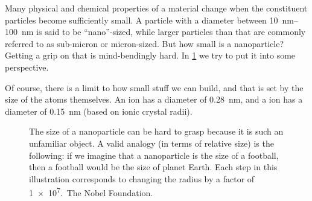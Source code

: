 \documentclass[draft,webedition,openright,titles,swedish,english]{LuaUUThesis}\usepackage[]{graphicx}\usepackage[]{xcolor}
\begin{document}
Many physical and chemical properties of a material change when
the constituent particles become sufficiently small.
A particle with a diameter between \qtyrange{10}{100}{\nm} is said to be
\enquote{nano}-sized, while larger particles than that are commonly referred
to as sub-micron or micron-sized.
But how small is a nanoparticle?
Getting a grip on that is mind-bendingly hard.
In \cref{fig:0100-nanoparticles-are-small} we try to put it into some perspective.

Of course, there is a limit to how small stuff we can build, and that is set by the size
of the atoms themselves. An \oxide{} ion has a diameter of \qty{0.28}{\nm},
and a  ion has a diameter of \qty{0.15}{\nm} (based on ionic crystal radii).

%

\begin{figure}[tbp]
\centering
\caption[A nanoparticle is very small]{%
   The size of a nanoparticle can be hard to grasp because it is such an unfamiliar
   object. A valid analogy (in terms of relative size) is the following:
   if we imagine that a nanoparticle is the size of a football, then a football
   would be the size of planet Earth.
   Each step in this illustration corresponds to changing
   the radius by a factor of \num[retain-unity-mantissa=false]{1e7}.
   {\footnotesize\CCBYND[\scriptsize]\,The Nobel Foundation.}
}
\label{fig:0100-nanoparticles-are-small}
\end{figure}
\end{document}

